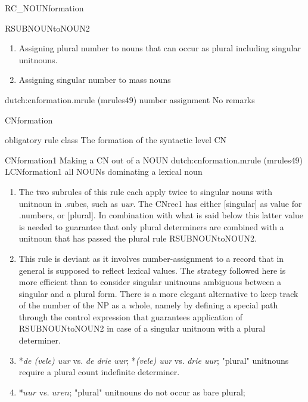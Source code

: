 \begin{mruleclass}{RC\_NOUNformation}
\begin{members}
\begin{member}
\end{member}
\begin{member}
 RSUBNOUNtoNOUN2
\begin{enumerate} 
\item Assigning plural number to nouns 
that can occur as plural including singular unitnouns.
\item Assigning singular number to mass nouns 
\end{enumerate}
\file dutch:cnformation.mrule (mrules49)
\semantics number assignment 
\remarks No remarks
\end{member}
\end{members}

\end{mruleclass}
\begin{mruleclass}{CNformation}
\begin{classdescr}
\kind obligatory rule class
\classtask The formation of the syntactic level CN
\classremarks

\nofilters
\nospeedrules
\noplannedrules
\norulesnotince
\begin{comments}
\end{comments}

\end{classdescr}

\begin{members}

\begin{member}
 CNformation1
 Making a CN out of a NOUN 
\file dutch:cnformation.mrule (mrules49)
\semantics LCNformation1
\example all NOUNs dominating a lexical noun
\remarks\mbox{}
\begin{enumerate}
\item The two subrules of this rule each apply twice to singular 
nouns with unitnoun in .subcs, such as {\em uur}. 
The CNrec1 has either [singular] as value for .numbers, or [plural].
In combination with what is said below this 
latter value is needed to guarantee that only plural determiners are 
combined with a unitnoun that has passed the plural rule RSUBNOUNtoNOUN2.
\item This rule is deviant as it involves number-assignment to a record that
in general is supposed to reflect lexical values. The strategy followed
here is more efficient than to
consider singular unitnouns ambiguous between a singular and a plural form.
There is a more elegant alternative to keep track of the number of the NP as a
whole, namely by defining a special path through the control expression that 
guarantees application of RSUBNOUNtoNOUN2 in case of a singular unitnoun  with 
a plural determiner.
\item *{\em de (vele) uur} vs. {\em de drie uur}; *{\em (vele) uur} vs. 
{\em drie uur};
"plural" unitnouns require a plural count indefinite determiner. 
\item *$uur$ vs. $uren$; "plural" unitnouns do not occur as bare plural;
\end{enumerate}



\end{member}
\end{members}
\end{mruleclass}
